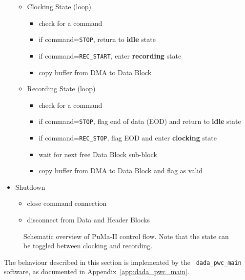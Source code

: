 \begin{itemize}
\begin{itemize}
\begin{itemize}
		\end{itemize}
	\item Clocking State (loop)
	\vspace{-2mm}
		\begin{itemize}
		\item check for a command
		\item if command={\tt STOP}, return to {\bf idle} state
		\item if command={\tt REC\_START}, enter {\bf recording} state
		\item copy buffer from DMA to Data Block
		\end{itemize}
	\item Recording State (loop)
	\vspace{-2mm}
		\begin{itemize}
		\item check for a command
		\item if command={\tt STOP}, flag end of data (EOD) and return to {\bf idle} state
		\item if command={\tt REC\_STOP}, flag EOD and enter {\bf clocking} state
		\item wait for next free Data Block sub-block
		\item copy buffer from DMA to Data Block and flag as valid
		\end{itemize}
	\end{itemize}
\item Shutdown
\vspace{-3mm}
	\begin{itemize}
	\item close command connection
	\item disconnect from Data and Header Blocks
	\end{itemize}
\end{itemize}

\begin{figure}
\centerline{}
\caption [\sffamily PuMa-II Control Flow]
{
Schematic overview of PuMa-II control flow.  Note that the state 
can be toggled between clocking and recording.
}
\label{fig:pwc_state}
\end{figure}

The behaviour described in this section is implemented by the {\tt
dada\_pwc\_main} software, as documented in
Appendix~\ref{app:dada_pwc_main}.
